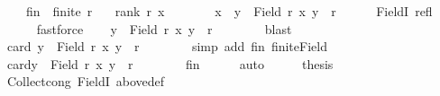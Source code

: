 \begin{isabellebody}
\ \ \ \ fin{\isacharcolon}{\kern0pt}\ \ {\isachardoublequoteopen}finite\ r{\isachardoublequoteclose}\isanewline
\ \ \ {\isachardoublequoteopen}rank\ r\ x\ {\isasymge}\ {}{\isachardoublequoteclose}\isanewline
%
\isadelimproof
%
\endisadelimproof
%
\isatagproof
{}\isamarkupfalse%
\ {\isacharminus}{\kern0pt}\isanewline
\ \ \isamarkupfalse%
\ {\isachardoublequoteopen}x\ {\isasymin}\ {\isacharbraceleft}{\kern0pt}y\ {\isasymin}\ Field\ r{\isachardot}{\kern0pt}\ {\isacharparenleft}{\kern0pt}x{\isacharcomma}{\kern0pt}\ y{\isacharparenright}{\kern0pt}\ {\isasymin}\ r{\isacharbraceright}{\kern0pt}{\isachardoublequoteclose}\isanewline
\ \ \ \ \isamarkupfalse%
\ FieldI{}\ refl\isanewline
\ \ \ \ \isamarkupfalse%
\ fastforce\isanewline
\ \ \isamarkupfalse%
\ {\isachardoublequoteopen}{\isacharbraceleft}{\kern0pt}y\ {\isasymin}\ Field\ r{\isachardot}{\kern0pt}\ {\isacharparenleft}{\kern0pt}x{\isacharcomma}{\kern0pt}\ y{\isacharparenright}{\kern0pt}\ {\isasymin}\ r{\isacharbraceright}{\kern0pt}\ {\isasymnoteq}\ {\isacharbraceleft}{\kern0pt}{\isacharbraceright}{\kern0pt}{\isachardoublequoteclose}\isanewline
\ \ \ \ \isamarkupfalse%
\ blast\isanewline
\ \ \isamarkupfalse%
\ {\isachardoublequoteopen}card\ {\isacharbraceleft}{\kern0pt}y\ {\isasymin}\ Field\ r{\isachardot}{\kern0pt}\ {\isacharparenleft}{\kern0pt}x{\isacharcomma}{\kern0pt}\ y{\isacharparenright}{\kern0pt}\ {\isasymin}\ r{\isacharbraceright}{\kern0pt}\ {\isasymnoteq}\ {}{\isachardoublequoteclose}\isanewline
\ \ \ \ \isamarkupfalse%
\ {\isacharparenleft}{\kern0pt}simp\ add{\isacharcolon}{\kern0pt}\ fin\ finite{\isacharunderscore}{\kern0pt}Field{\isacharparenright}{\kern0pt}\isanewline
\ \ \isamarkupfalse%
\ \isamarkupfalse%
\ {\isachardoublequoteopen}card{\isacharbraceleft}{\kern0pt}y\ {\isasymin}\ Field\ r{\isachardot}{\kern0pt}\ {\isacharparenleft}{\kern0pt}x{\isacharcomma}{\kern0pt}\ y{\isacharparenright}{\kern0pt}\ {\isasymin}\ r{\isacharbraceright}{\kern0pt}\ {\isasymge}\ {}{\isachardoublequoteclose}\isanewline
\ \ \ \ \isamarkupfalse%
\ fin\isanewline
\ \ \ \ \isamarkupfalse%
\ auto\isanewline
\ \ \isamarkupfalse%
\ \isamarkupfalse%
\ {\isacharquery}{\kern0pt}thesis\isanewline
\ \ \ \ \isamarkupfalse%
\ Collect{\isacharunderscore}{\kern0pt}cong\ FieldI{}\ above{\isacharunderscore}{\kern0pt}def\isanewline

\end{isabellebody}
